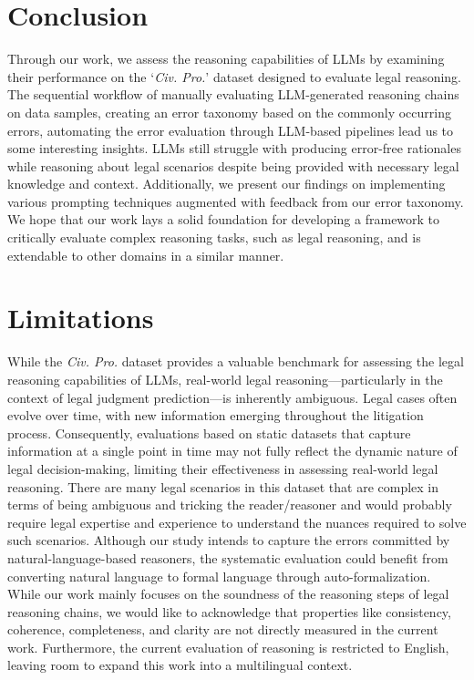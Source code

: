 \section{Conclusion}
Through our work, we assess the reasoning capabilities of LLMs by examining their performance on the `\textit{Civ. Pro.}' dataset designed to evaluate legal reasoning. The sequential workflow of manually evaluating LLM-generated reasoning chains on data samples, creating an error taxonomy based on the commonly occurring errors, automating the error evaluation through LLM-based pipelines lead us to some interesting insights. LLMs still struggle with producing error-free rationales while reasoning about legal scenarios despite being provided with necessary legal knowledge and context. Additionally, we present our findings on implementing various prompting techniques augmented with feedback from our error taxonomy. We hope that our work lays a solid foundation for developing a framework to critically evaluate complex reasoning tasks, such as legal reasoning, and is extendable to other domains in a similar manner.    

\section*{Limitations}
While the \textit{Civ. Pro.} dataset provides a valuable benchmark for assessing the legal reasoning capabilities of LLMs, real-world legal reasoning—particularly in the context of legal judgment prediction—is inherently ambiguous. Legal cases often evolve over time, with new information emerging throughout the litigation process. Consequently, evaluations based on static datasets that capture information at a single point in time may not fully reflect the dynamic nature of legal decision-making, limiting their effectiveness in assessing real-world legal reasoning. There are many legal scenarios in this dataset that are complex in terms of being ambiguous and tricking the reader/reasoner and would probably require legal expertise and experience to understand the nuances required to solve such scenarios. Although our study intends to capture the errors committed by natural-language-based reasoners, the systematic evaluation could benefit from converting natural language to formal language through auto-formalization. While our work mainly focuses on the soundness of the reasoning steps of legal reasoning chains, we would like to acknowledge that properties like consistency, coherence, completeness, and clarity are not directly measured in the current work. Furthermore, the current evaluation of reasoning is restricted to English, leaving room to expand this work into a multilingual context.

